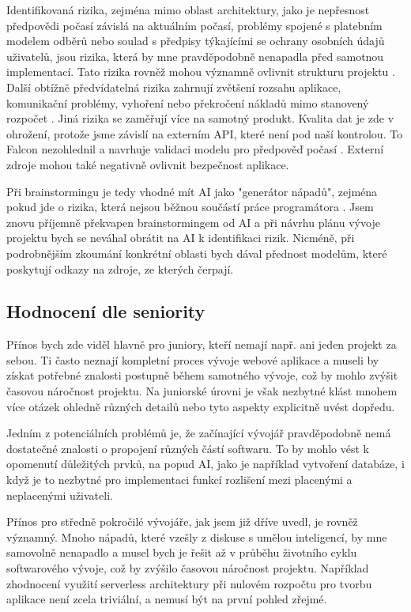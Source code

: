 \documentclass[FM,DP]{tulthesis}
\begin{document}
		Identifikovaná rizika, zejména mimo oblast architektury, jako je nepřesnost předpovědi počasí závislá na aktuálním počasí, problémy spojené s platebním modelem odběrů nebo soulad s předpisy týkajícími se ochrany osobních údajů uživatelů, jsou rizika, která by mne pravděpodobně nenapadla před samotnou implementací. Tato rizika rovněž mohou významně ovlivnit strukturu projektu \cite{chatgpt_analyza}. Další obtížně předvídatelná rizika zahrnují zvětšení rozsahu aplikace, komunikační problémy, vyhoření nebo překročení nákladů mimo stanovený rozpočet \cite{claude_analyza} \cite{bard_analyza}. Jiná rizika se zaměřují více na samotný produkt. Kvalita dat je zde v ohrožení, protože jsme závislí na externím API, které není pod naší kontrolou. To Falcon nezohlednil a navrhuje validaci modelu pro předpověď počasí \cite{falcon_analyza}. Externí zdroje mohou také negativně ovlivnit bezpečnost aplikace. 
		
		Při brainstormingu je tedy vhodné mít AI jako "generátor nápadů", zejména pokud jde o rizika, která nejsou běžnou součástí práce programátora \cite{falcon_analyza} \cite{claude_analyza} \cite{codellama_analyza}. Jsem znovu příjemně překvapen brainstormingem od AI a při návrhu plánu vývoje projektu bych se neváhal obrátit na AI k identifikaci rizik. Nicméně, při podrobnějším zkoumání konkrétní oblasti bych dával přednost modelům, které poskytují odkazy na zdroje, ze kterých čerpají.
		
		\subsection{Hodnocení dle seniority}
		Přínos bych zde viděl hlavně pro juniory, kteří nemají např. ani jeden projekt za sebou. Ti často neznají kompletní proces vývoje webové aplikace a museli by získat potřebné znalosti postupně během samotného vývoje, což by mohlo zvýšit časovou náročnost projektu. Na juniorské úrovni je však nezbytné klást mnohem více otázek ohledně různých detailů nebo tyto aspekty explicitně uvést dopředu.
		
		Jedním z potenciálních problémů je, že začínající vývojář pravděpodobně nemá dostatečné znalosti o propojení různých částí softwaru. To by mohlo vést k opomenutí důležitých prvků, na popud AI, jako je například vytvoření databáze, i když je to nezbytné pro implementaci funkcí rozlišení mezi placenými a neplacenými uživateli.
		
		Přínos pro středně pokročilé vývojáře, jak jsem již dříve uvedl, je rovněž významný. Mnoho nápadů, které vzešly z diskuse s umělou inteligencí, by mne samovolně nenapadlo a musel bych je řešit až v průběhu životního cyklu softwarového vývoje, což by zvýšilo časovou náročnost projektu. Například zhodnocení využití serverless architektury při nulovém rozpočtu pro tvorbu aplikace není zcela triviální, a nemusí být na první pohled zřejmé.
		
\end{document}
